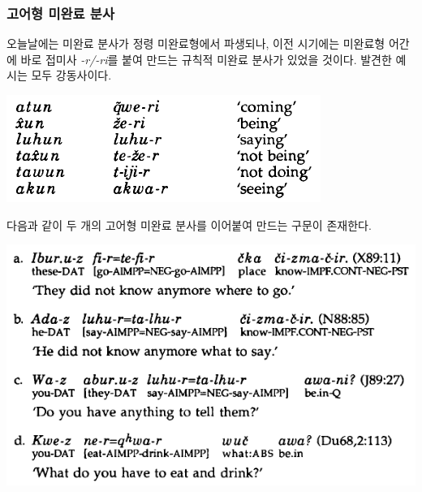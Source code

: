 \subsubsection{고어형 미완료 분사}
오늘날에는 미완료 분사가 정령 미완료형에서 파생되나, 이전 시기에는 미완료형 어간에 바로 접미사 \textit{-r/-ri}를 붙여 만드는 규칙적 미완료 분사가 있었을 것이다. 발견한 예시는 모두 강동사이다.
\begin{center}
\includegraphics{Lezgian/src/impa.png}
\end{center}
다음과 같이 두 개의 고어형 미완료 분사를 이어붙여 만드는 구문이 존재한다.
\begin{center}
\includegraphics{Lezgian/src/papa.png}
\end{center}














